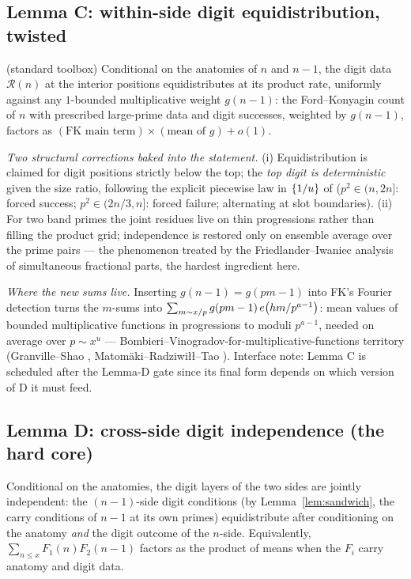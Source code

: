 \subsection{Lemma C: within-side digit equidistribution, twisted}

\begin{lemma}[C]\label{lem:C}
\statusO{} (standard toolbox)\quad
Conditional on the anatomies of $n$ and $n-1$, the digit data
$\mathcal R(n)$ at the interior positions equidistributes at its product
rate, uniformly against any $1$-bounded multiplicative weight $g(n-1)$:
the Ford--Konyagin count of $n$ with prescribed large-prime data and digit
successes, weighted by $g(n-1)$, factors as
$(\text{FK main term})\times(\text{mean of }g)+o(1)$.
\end{lemma}

\noindent\emph{Two structural corrections baked into the statement.}
(i) Equidistribution is claimed for digit positions strictly below the
top; the \emph{top digit is deterministic} given the size ratio, following
the explicit piecewise law in $\left\{1/u\right\}$ of \cite{FK21} ($p^2\in(n,2n]$:
forced success; $p^2\in(2n/3,n]$: forced failure; alternating at slot
boundaries). (ii) For two band primes the joint residues live on thin
progressions rather than filling the product grid; independence is
restored only on ensemble average over the prime pairs --- the phenomenon
treated by the Friedlander--Iwaniec analysis of simultaneous fractional
parts, the hardest ingredient here.

\noindent\emph{Where the new sums live.} Inserting $g(n-1)=g(pm-1)$ into
FK's Fourier detection turns the $m$-sums into
$\sum_{m\sim x/p}g(pm-1)\,e\!\left(hm/p^{a-1}\right)$: mean values of bounded
multiplicative functions in progressions to moduli $p^{a-1}$, needed on
average over $p\sim x^u$ --- Bombieri--Vinogradov-for-multiplicative-functions
territory (Granville--Shao \cite{GS}, Matom\"aki--Radziwi\l\l--Tao
\cite{MRT}). Interface note: Lemma C is scheduled after the Lemma-D gate
since its final form depends on which version of D it must feed.

\subsection{Lemma D: cross-side digit independence (the hard core)}

\begin{lemma}[D]\label{lem:D}
\statusO\quad
Conditional on the anatomies, the digit layers of the two sides are
jointly independent: the $(n-1)$-side digit conditions (by
Lemma~\ref{lem:sandwich}, the carry conditions of $n-1$ at its own primes)
equidistribute after conditioning on the anatomy \emph{and} the digit
outcome of the $n$-side. Equivalently, $\sum_{n\le x}F_1(n)F_2(n-1)$
factors as the product of means when the $F_i$ carry anatomy and digit
data.
\end{lemma}

